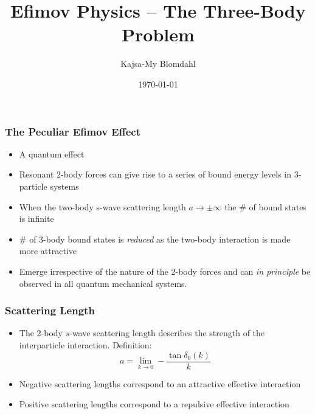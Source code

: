 \documentclass{beamer}
\title[Short title]{Efimov Physics -- The Three-Body Problem} %
\author{Kajsa-My Blomdahl} %
\institute[SU] %
{
Stockholms Universitet \\ %
\medskip
\textit{kajsamy.blomdahl@fysik.su.se} %
}
\date{\today} %
\begin{document}
\begin{frame}
\titlepage %
\end{frame}


\begin{frame}
\frametitle{The Peculiar Efimov Effect}
\begin{itemize}
\item A quantum effect
\item Resonant 2-body forces can give rise to a series of bound energy levels in 3-particle systems
\item When the two-body s-wave scattering length $a \rightarrow \pm\infty$ the $\#$ of bound states is infinite
\item  $\#$ of 3-body bound states is \textit{reduced} as the two-body interaction is made more attractive
\item Emerge irrespective of the nature of the 2-body forces and can \textit{in principle} be observed in all quantum mechanical systems. 
\end{itemize}
\end{frame}


\begin{frame}
\frametitle{Scattering Length}
\begin{itemize}
	\item The 2-body $s$-wave scattering length describes the strength of the interparticle interaction. Definition:
	\begin{equation}
	a = \lim_{k \to 0} -\frac{\tan\delta_0(k)}{k}
	\end{equation}
	\item Negative scattering lengths correspond to an attractive effective interaction
	\item Positive scattering lengths correspond to a repulsive effective interaction
\end{itemize}
\end{frame}
\end{document}
